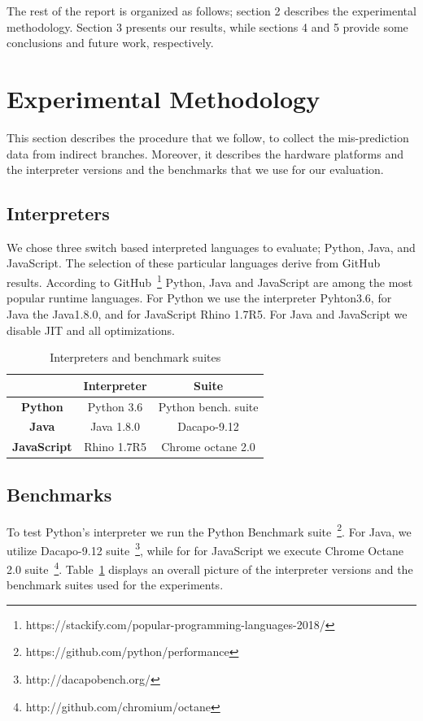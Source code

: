 \documentclass[parskip=full, paper=a4, fontsize=12pt]{scrartcl}
\numberwithin{equation}{section}
\numberwithin{figure}{section}
\numberwithin{table}{section}
\begin{document}
The rest of the report is organized as follows; section 2 describes the
experimental methodology.  Section 3 presents our results, while
sections 4 and 5 provide some conclusions and future work,
respectively.  

\section{Experimental Methodology}
This section describes the procedure that we follow, to collect the
mis-prediction data from indirect branches. Moreover, it describes the
hardware platforms and the interpreter versions and the benchmarks
that we use for our evaluation. 

\subsection{Interpreters}
We chose three switch based interpreted languages to evaluate; Python,
Java, and JavaScript. The selection of these particular languages
derive from GitHub results. According to
GitHub~\footnote{https://stackify.com/popular-programming-languages-2018/}
Python, Java and JavaScript are among the most popular runtime
languages. For Python we use the interpreter Pyhton3.6, for Java the
Java1.8.0, and for JavaScript Rhino 1.7R5. For Java and JavaScript we
disable JIT and all optimizations. 

\begin{table}[]
	\centering
	\caption{Interpreters and benchmark suites}
	\label{tab:inter_bench}
	\begin{tabular}{|c|c|c|}
		\hline
		\textbf{}           & \textbf{Interpreter} & \textbf{Suite}      \\ 
        \hline
		\textbf{Python}     & Python 3.6           & Python bench. suite \\ 
        \hline
		\textbf{Java}       & Java 1.8.0           & Dacapo-9.12         \\ 
        \hline
		\textbf{JavaScript} & Rhino 1.7R5          & Chrome octane 2.0   \\ 
        \hline
	\end{tabular}
\end{table}

\subsection{Benchmarks} 
To test Python's interpreter we run the Python Benchmark
suite~\footnote{https://github.com/python/performance}. For Java, we
utilize Dacapo-9.12 suite~\footnote{http://dacapobench.org/}, while
for for JavaScript we execute Chrome Octane 2.0
suite~\footnote{http://github.com/chromium/octane}.
Table~\ref{tab:inter_bench} displays an overall picture of the interpreter
versions and the benchmark suites used for the experiments.
\end{document}
